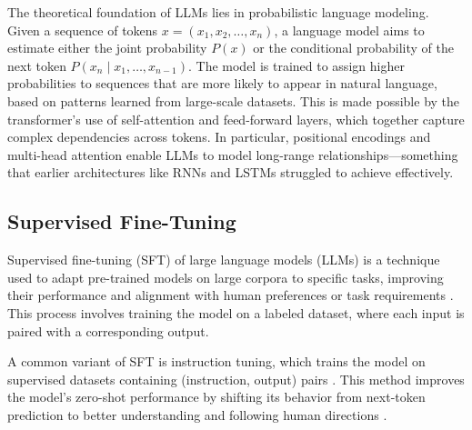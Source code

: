 The theoretical foundation of LLMs lies in probabilistic language modeling. Given a sequence of tokens \( x = (x_1, x_2, \dots, x_n) \), a language model aims to estimate either the joint probability \( P(x) \) or the conditional probability of the next token \( P(x_n \mid x_1, \dots, x_{n-1}) \). The model is trained to assign higher probabilities to sequences that are more likely to appear in natural language, based on patterns learned from large-scale datasets. This is made possible by the transformer's use of self-attention and feed-forward layers, which together capture complex dependencies across tokens. In particular, positional encodings and multi-head attention enable LLMs to model long-range relationships—something that earlier architectures like RNNs and LSTMs struggled to achieve effectively.



\subsection{Supervised Fine-Tuning}

Supervised fine-tuning (SFT) of large language models (LLMs) is a technique used to adapt pre-trained models on large corpora to specific tasks, improving their performance and alignment with human preferences or task requirements \cite{Wang2023AligningLargeLanguageModels}. This process involves training the model on a labeled dataset, where each input is paired with a corresponding output.

A common variant of SFT is instruction tuning, which trains the model on supervised datasets containing (instruction, output) pairs \cite{Wei2022FinetunedLMZeroShot}. This method improves the model’s zero-shot performance by shifting its behavior from next-token prediction to better understanding and following human directions \cite{Zhang2024InstructionTuningLLM}. 


